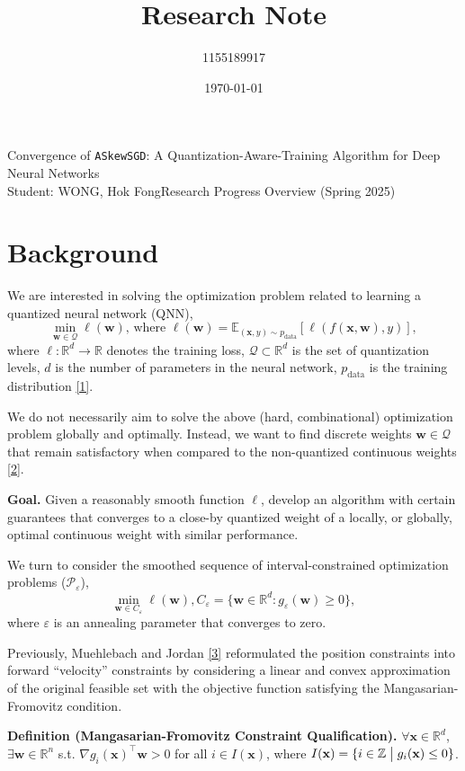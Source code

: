 \documentclass[10pt,a4paper]{article}
\author{1155189917}
\title{Research Note}
\date{\today}
\begin{document}
\noindent Convergence of \texttt{ASkewSGD}: A Quantization-Aware-Training Algorithm for Deep Neural Networks\\
Student: WONG, Hok Fong\hfill Research Progress Overview (Spring 2025)\\
\phantom{}\hrulefill
\setlength{\parindent}{0pt}
\section{Background} 

We are interested in solving the optimization problem related to learning a quantized neural network (QNN),
\[\min_{\mathbf{w}\in\mathcal{Q}} \ell(\mathbf{w})\text{, where }\ell(\mathbf{w})=\mathbb{E}_{(\mathbf{x},y)\sim p_{\text{data}}} [\ell(f(\mathbf{x},\mathbf{w}), y)],\]
where $\ell:\mathbb{R}^d\to \mathbb{R}$ denotes the training loss, $\mathcal{Q}\subset \mathbb{R}^d$ is the set of quantization levels,
$d$ is the number of parameters in the neural network, $p_{\text{data}}$ is the training distribution \ref{1}.

We do not necessarily aim to solve the above (hard, combinational) optimization problem globally and optimally.
Instead, we want to find discrete weights $\mathbf{w}\in \mathcal{Q}$ that remain satisfactory when compared to the
non-quantized continuous weights \ref{2}.

\textbf{Goal.} Given a reasonably smooth function $\ell$, develop an algorithm with certain guarantees that converges
to a close-by quantized weight of a locally, or globally, optimal continuous weight with similar performance.

We turn to consider the smoothed sequence of interval-constrained optimization problems ($\mathcal{P}_\varepsilon$),
\[\min_{\mathbf{w}\in C_\varepsilon} \ell(\mathbf{w}), C_\varepsilon=\{\mathbf{w}\in \mathbb{R}^d: g_\varepsilon(\mathbf{w})\geq 0\},\]
where $\varepsilon$ is an annealing parameter that converges to zero.

Previously, Muehlebach and Jordan \ref{3} reformulated the position constraints into forward ``velocity'' constraints by considering a
linear and convex approximation of the original feasible set with the objective function satisfying the Mangasarian-Fromovitz condition.

\textbf{Definition (Mangasarian-Fromovitz Constraint Qualification).} $\forall \mathbf{x}\in \mathbb{R}^d$, $\exists \mathbf{w}\in \mathbb{R}^n$
s.t. $\nabla g_i(\mathbf{x})^\top \mathbf{w}>0$ for all $i\in I(\mathbf{x})$, where $I(\mathbf{x})=\{i\in \mathbb{Z}\bigm| g_i(\mathbf{x})\leq 0\}$.
\end{document}
